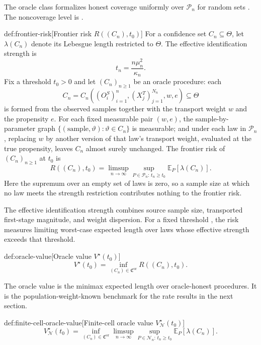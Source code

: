 \documentclass[11pt]{article}
\begin{document}
The oracle class  formalizes honest coverage uniformly over \(\mathcal P_n\) for random sets . The noncoverage level is .

\begin{definitionv}{def:frontier-risk}[Frontier risk $R((C_n),t_0)$]
For a confidence set \(C_n\subseteq\Theta\), let \(\lambda(C_n)\) denote its Lebesgue length restricted to \(\Theta\). The effective identification strength is
\[
t_n=\frac{n\mu_n^2}{\kappa_n}.
\]
Fix a threshold \(t_0>0\) and let \((C_n)_{n\ge 1}\) be an oracle procedure: each
\[
C_n=C_n\!\left((O_i^S)_{i=1}^n,(X_j^T)_{j=1}^{N_n},w,e\right)\subseteq\Theta
\]
is formed from the observed samples together with the transport weight \(w\) and the propensity \(e\). For each fixed measurable pair \((w,e)\), the sample-by-parameter graph \(\{(\text{sample},\vartheta):\vartheta\in C_n\}\) is measurable; and under each law in \(\mathcal P_n\), replacing \(w\) by another version of that law's transport weight, evaluated at the true propensity, leaves \(C_n\) almost surely unchanged. The frontier risk of \((C_n)_{n\ge1}\) at \(t_0\) is
\[
R((C_n),t_0)
=
\limsup_{n\to\infty}
\sup_{P\in\mathcal P_n:\,t_n\ge t_0}
\mathbb E_P[\lambda(C_n)].
\]
Here the supremum over an empty set of laws is zero, so a sample size at which no law meets the strength restriction contributes nothing to the frontier risk.
\end{definitionv}

The effective identification strength  combines source sample size, transported first-stage magnitude, and weight dispersion. For a fixed threshold , the risk  measures limiting worst-case expected length over laws whose effective strength exceeds that threshold.

\begin{definitionv}{def:oracle-value}[Oracle value $V^\star(t_0)$]
\[
V^\star(t_0)
=
\inf_{(C_n)\in\mathfrak C^{\mathrm{or}}}
R((C_n),t_0).
\]
\end{definitionv}

The oracle value  is the minimax expected length over oracle-honest procedures. It is the population-weight-known benchmark for the rate results in the next section.

\begin{definitionv}{def:finite-cell-oracle-value}[Finite-cell oracle value $V_{\mathcal N}^\star(t_0)$]
\[
V_{\mathcal N}^\star(t_0)
=
\inf_{(C_n)\in\mathfrak C^{\mathrm{or}}}
\limsup_{n\to\infty}
\sup_{P\in\mathcal N_n:\,t_n\ge t_0}
\mathbb E_P[\lambda(C_n)].
\]
\end{definitionv}
\end{document}
